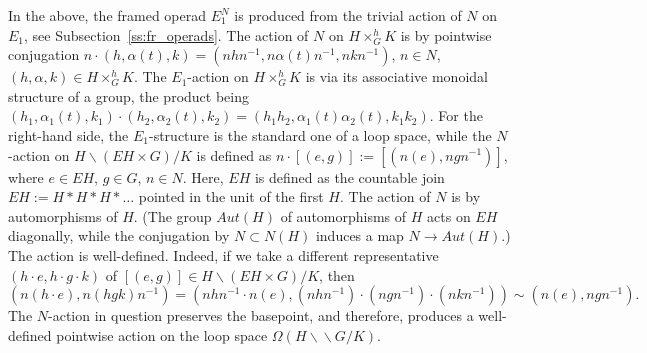 \documentclass[11pt]{amsart}
\theoremstyle{definition}
\newcommand{\bbslash}{\backslash\!\!\backslash}
\numberwithin{equation}{section}
\begin{document}
In the above, the framed operad $E_1^N$ is produced from the trivial action of $N$ on $E_1$, see Subsection~\ref{ss:fr_operads}.
The action of $N$ on $H\times_G^h K$ is by pointwise conjugation $n\cdot (h,\alpha(t),k)=(nhn^{-1},n\alpha(t)n^{-1},nkn^{-1})$, $n\in N$, $(h,\alpha,k)\in H\times_G^h K$.
The $E_1$-action on $H\times_G^h K$  is via its associative monoidal structure of a group, the product being $(h_1,\alpha_1(t),k_1)\cdot (h_2,\alpha_2(t),k_2)=(h_1h_2,\alpha_1(t)\alpha_2(t),k_1k_2)$.
For the right-hand side, the $E_1$-structure is the standard one of a loop space, while the $N$-action on $H\backslash(EH\times G)/K$ is defined as $n\cdot[ (e,g)]:=[(n(e),ngn^{-1})]$, where $e\in EH$, $g\in G$, $n\in N$.
Here, $EH$ is defined as the countable join $EH:=H*H*H*\ldots$ pointed in the unit of the first $H$. The action of $N$ is by automorphisms of $H$. (The group $Aut(H)$ of automorphisms of $H$ acts on $EH$ diagonally, while the conjugation 
by $N\subset N(H)$ induces  a map $N\to Aut(H)$.) The action is well-defined. Indeed, if we take a different representative $(h\cdot e,h\cdot g\cdot k)$ of $[(e,g)]\in H\backslash(EH\times G)/K$, then 
\[
\left(n(h\cdot e),n(hgk)n^{-1}\right)=\left(nhn^{-1}\cdot n(e), (nhn^{-1})\cdot (ngn^{-1})\cdot (nkn^{-1})\right) \sim (n(e),ngn^{-1}).
\]
The $N$-action in question preserves the basepoint, and therefore, produces a well-defined pointwise action on the loop space $\Omega\left(H\bbslash G/K\right)$.
\end{document}
